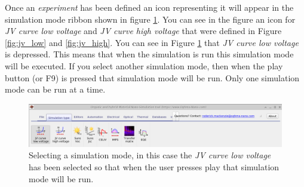 Once an \emph{experiment} has been defined an icon representing it will appear in the simulation mode ribbon shown in figure \ref{fig:simmodes}. You can see in the figure an icon for \emph{JV curve low voltage} and \emph{JV curve high voltage} that were defined in Figure \ref{fig:jv_low} and \ref{fig:jv_high}. You can see in Figure \ref{fig:simmodes} that \emph{JV curve low voltage} is depressed. This means that when the simulation is run this simulation mode will be executed. If you select another simulation mode, then when the play button (or F9) is pressed that simulation mode will be run. Only one simulation mode can be run at a time.


\begin{figure}[H]
\centering
\includegraphics[width=\linewidth,height=0.2\linewidth]{./images/sim_editors/ribbon_sim_modes.png}
\caption{Selecting a simulation mode, in this case the \emph{JV curve low voltage} has been selected so that when the user presses play that simulation mode will be run.}
\label{fig:simmodes}
\end{figure}













